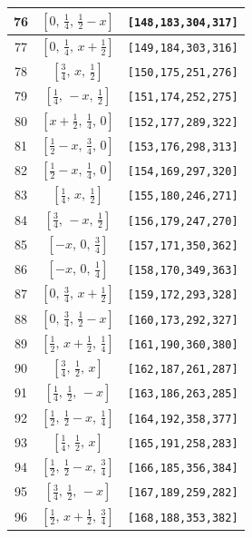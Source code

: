 \documentclass[fleqn,8pt]{jsarticle}
\begin{document}
\begin{longtable}{ccc}
76 & $\left[ 0,\, \frac{1}{4},\, \frac{1}{2} - x \right]$ & {\tt [148,183,304,317]} \\ \hline
77 & $\left[ 0,\, \frac{1}{4},\, x + \frac{1}{2} \right]$ & {\tt [149,184,303,316]} \\ \hline
78 & $\left[ \frac{3}{4},\, x,\, \frac{1}{2} \right]$ & {\tt [150,175,251,276]} \\ \hline
79 & $\left[ \frac{1}{4},\, - x,\, \frac{1}{2} \right]$ & {\tt [151,174,252,275]} \\ \hline
80 & $\left[ x + \frac{1}{2},\, \frac{1}{4},\, 0 \right]$ & {\tt [152,177,289,322]} \\ \hline
81 & $\left[ \frac{1}{2} - x,\, \frac{3}{4},\, 0 \right]$ & {\tt [153,176,298,313]} \\ \hline
82 & $\left[ \frac{1}{2} - x,\, \frac{1}{4},\, 0 \right]$ & {\tt [154,169,297,320]} \\ \hline
83 & $\left[ \frac{1}{4},\, x,\, \frac{1}{2} \right]$ & {\tt [155,180,246,271]} \\ \hline
84 & $\left[ \frac{3}{4},\, - x,\, \frac{1}{2} \right]$ & {\tt [156,179,247,270]} \\ \hline
85 & $\left[ - x,\, 0,\, \frac{3}{4} \right]$ & {\tt [157,171,350,362]} \\ \hline
86 & $\left[ - x,\, 0,\, \frac{1}{4} \right]$ & {\tt [158,170,349,363]} \\ \hline
87 & $\left[ 0,\, \frac{3}{4},\, x + \frac{1}{2} \right]$ & {\tt [159,172,293,328]} \\ \hline
88 & $\left[ 0,\, \frac{3}{4},\, \frac{1}{2} - x \right]$ & {\tt [160,173,292,327]} \\ \hline
89 & $\left[ \frac{1}{2},\, x + \frac{1}{2},\, \frac{1}{4} \right]$ & {\tt [161,190,360,380]} \\ \hline
90 & $\left[ \frac{3}{4},\, \frac{1}{2},\, x \right]$ & {\tt [162,187,261,287]} \\ \hline
91 & $\left[ \frac{1}{4},\, \frac{1}{2},\, - x \right]$ & {\tt [163,186,263,285]} \\ \hline
92 & $\left[ \frac{1}{2},\, \frac{1}{2} - x,\, \frac{1}{4} \right]$ & {\tt [164,192,358,377]} \\ \hline
93 & $\left[ \frac{1}{4},\, \frac{1}{2},\, x \right]$ & {\tt [165,191,258,283]} \\ \hline
94 & $\left[ \frac{1}{2},\, \frac{1}{2} - x,\, \frac{3}{4} \right]$ & {\tt [166,185,356,384]} \\ \hline
95 & $\left[ \frac{3}{4},\, \frac{1}{2},\, - x \right]$ & {\tt [167,189,259,282]} \\ \hline
96 & $\left[ \frac{1}{2},\, x + \frac{1}{2},\, \frac{3}{4} \right]$ & {\tt [168,188,353,382]} \\
\end{longtable}
\end{document}
